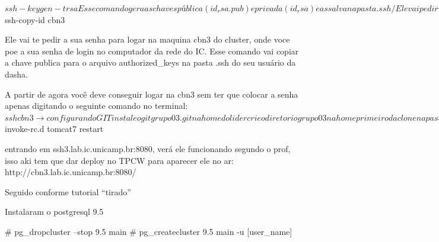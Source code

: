 \documentclass{article}
\begin{document}
$ ssh-keygen -t rsa


Esse comando gera as chaves pública (id_rsa.pub) e privada (id_rsa) e as salva na pasta .ssh/

Ele vai pedir um nome de arquivo e uma senha/confirmação de senha. Pode deixar todos em branco.

Em seguida rode o seguinte comando
$ ssh-copy-id cbn3

Ele vai te pedir a sua senha para logar na maquina cbn3 do cluster, onde voce poe a sua senha de login no computador da rede do IC.
Esse comando vai copiar a chave publica para o arquivo authorized_keys na pasta .ssh do seu usuário da dasha.


A partir de agora você deve conseguir logar na cbn3 sem ter que colocar a senha apenas digitando o seguinte comando no terminal:
$ ssh cbn3


→ configurando GIT 

instale o git grupo03.git na home do lider

crie o diretorio grupo03 na home

primeiro da clone na pasta do lider (ra082674……)

depois da um pull pra atualizar

depois pra adicionar algum arquivo na pasta do lider

da add

obs: se vc dar git status, aparece os arquivos novos a serem pushados

depois commit -m

depois push



→ configurando PostgreSQL 


-> tirado de http://www.ggte.unicamp.br/eam/mod/wiki/view.php?id=17445
Configurado Tomcat
-> configurar Tomcat

criar PATH para a pasta do Tomcat onde está instalado tpcw:

/var/lib/tomcat7/webapps/tpcw




para reiniciar o Tomcat:
$ invoke-rc.d tomcat7 restart

entrando em ssh3.lab.ic.unicamp.br:8080, verá ele funcionando
segundo o prof, isso aki tem que dar deploy no TPCW para aparecer ele no ar:
http://cbn3.lab.ic.unicamp.br:8080/

Seguido conforme tutorial “tirado”

Instalaram o postgresql 9.5

# pg_dropcluster --stop 9.5 main
# pg_createcluster 9.5 main -u [user_name]
\end{document}
